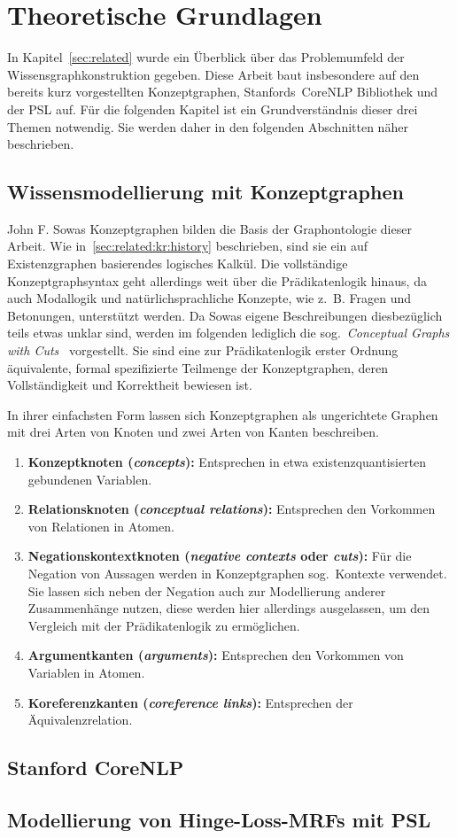 \chapter{Theoretische Grundlagen}%
\label{sec:theory}

In Kapitel~\ref{sec:related} wurde ein Überblick über das Problemumfeld der Wissensgraphkonstruktion gegeben.
Diese Arbeit baut insbesondere auf den bereits kurz vorgestellten Konzeptgraphen, Stanfords~CoreNLP Bibliothek und der PSL auf.
Für die folgenden Kapitel ist ein Grundverständnis dieser drei Themen notwendig.
Sie werden daher in den folgenden Abschnitten näher beschrieben.

\section{Wissensmodellierung mit Konzeptgraphen}%
\label{sec:theory:cg}

John F. Sowas Konzeptgraphen bilden die Basis der Graphontologie dieser Arbeit.
Wie in~\ref{sec:related:kr:history} beschrieben, sind sie ein auf Existenzgraphen basierendes logisches Kalkül.
Die vollständige Konzeptgraphsyntax geht allerdings weit über die Prädikatenlogik hinaus, da auch Modallogik und natürlichsprachliche Konzepte, wie z.~B. Fragen und Betonungen, unterstützt werden.
Da Sowas eigene Beschreibungen diesbezüglich teils etwas unklar sind, werden im folgenden lediglich die sog.~\textit{Conceptual Graphs with Cuts}~\cite{Dau2003} vorgestellt.
Sie sind eine zur Prädikatenlogik erster Ordnung äquivalente, formal spezifizierte Teilmenge der Konzeptgraphen, deren Vollständigkeit und Korrektheit bewiesen ist.

In ihrer einfachsten Form lassen sich Konzeptgraphen als ungerichtete Graphen mit drei Arten von Knoten und zwei Arten von Kanten beschreiben.
\begin{enumerate}
	\item \textbf{Konzeptknoten (\textit{concepts}):}
		Entsprechen in etwa existenzquantisierten gebundenen Variablen.
	\item \textbf{Relationsknoten (\textit{conceptual relations}):}
		Entsprechen den Vorkommen von Relationen in Atomen.
	\item \textbf{Negationskontextknoten (\textit{negative contexts} oder \textit{cuts}):}
		Für die Negation von Aussagen werden in Konzeptgraphen sog.~Kontexte verwendet.
		Sie lassen sich neben der Negation auch zur Modellierung anderer Zusammenhänge nutzen, diese werden hier allerdings ausgelassen, um den Vergleich mit der Prädikatenlogik zu ermöglichen.
	\item \textbf{Argumentkanten (\textit{arguments}):}
		Entsprechen den Vorkommen von Variablen in Atomen.
	\item \textbf{Koreferenzkanten (\textit{coreference links}):}
		Entsprechen der Äquivalenzrelation.
\end{enumerate}

\section{Stanford CoreNLP}%
\label{sec:theory:nlp}

\section{Modellierung von Hinge-Loss-MRFs mit PSL}%
\label{sec:theory:psl}
